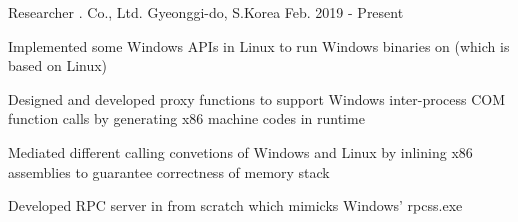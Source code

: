 

\begin{cvskills}

  \cventry
    {Researcher} %
    {\mycompany{}. Co., Ltd.} %
    {Gyeonggi-do, S.Korea} %
    {Feb. 2019 - Present} %
    {
      \begin{cvitems} %
        \item {Implemented some Windows APIs in Linux to run Windows binaries on \mycompany{} (which is based on Linux)}
	\item {Designed and developed proxy functions to support Windows inter-process COM function calls by generating x86 machine codes in runtime}
	\item {Mediated different calling convetions of Windows and Linux by inlining x86 assemblies to guarantee correctness of memory stack}
	\item {Developed RPC server in \mycompany{} from scratch which mimicks Windows' rpcss.exe}  
      \end{cvitems}
    }




\end{cvskills}
